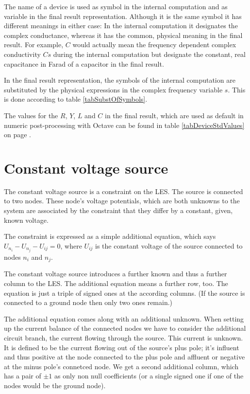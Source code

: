 The name of a device is used as symbol in the internal computation and as
variable in the final result representation. Although it is the same
symbol it has different meanings in either case: In the internal
computation it designates the complex conductance, whereas it has the
common, physical meaning in the final result. For example, $C$ would
actually mean the frequency dependent complex conductivity $Cs$ during the
internal computation but designate the constant, real capacitance in Farad
of a capacitor in the final result.

In the final result representation, the symbols of the internal
computation are substituted by the physical expressions in the complex
frequency variable $s$. This is done according to table
\ref{tabSubstOfSymbols}.

The values for the $R$, $Y$, $L$ and $C$ in the final result, which are
used as default in numeric post-processing with Octave can be found in
table \ref{tabDeviceStdValues} on page \pageref{tabDeviceStdValues}.


\section{Constant voltage source}
\label{secModellingDevs_ConstVoltSrc}

The constant voltage source is a constraint on the LES. The source is
connected to two nodes. These node's voltage potentials, which are both
unknowns to the system are associated by the constraint that they differ
by a constant, given, known voltage.

The constraint is expressed as a simple additional equation, which says
$U_{n_i} - U_{n_j} - U_{ij} = 0$, where $U_{ij}$ is the constant voltage
of the source connected to nodes $n_i$ and $n_j$.

The constant voltage source introduces a further known and thus a further
column to the LES. The additional equation means a further row, too. The
equation is just a triple of signed ones at the according columns. (If the
source is connected to a ground node then only two ones remain.)

The additional equation comes along with an additional unknown. When
setting up the current balance of the connected nodes we have to consider
the additional circuit branch, the current flowing through the source.
This current is unknown. It is defined to be the current flowing out of
the source's plus pole; it's influent and thus positive at the node
connected to the plus pole and affluent or negative at the minus pole's
connetced node. We get a second additional column, which has a pair of
$\pm 1$ as only non null coefficients (or a single signed one if one of
the nodes would be the ground node).

